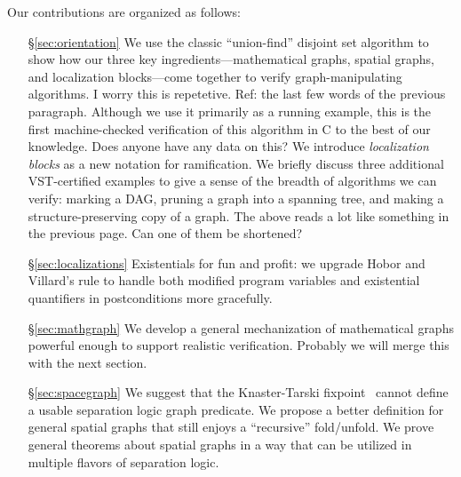 Our contributions are organized as follows:
\begin{itemize}
\item[\S\ref{sec:orientation}] We use the classic ``union-find'' disjoint set algorithm to show {\color{magenta}how our three key ingredients---mathematical graphs, spatial graphs, and localization blocks---come together to verify 
graph-manipulating algorithms.} 
{\color{blue}I worry this is repetetive. Ref: the last few words of the previous paragraph.}
Although we use it primarily as a running example, this is the first machine-checked verification of this algorithm in C to the best of our knowledge. {\color{blue} Does anyone have any data on this?}  {\color{magenta} We introduce \emph{localization blocks} as a new notation for ramification. We briefly discuss three additional VST-certified examples to give a sense of the breadth of algorithms we can verify: marking a DAG, pruning a graph into a spanning tree, and making a structure-preserving copy of a 
graph.}
{\color{blue}The above reads a lot like something in the previous page. Can one 
of them be shortened?}
\item[\S\ref{sec:localizations}] {\color{magenta} Existentials for fun and profit: we upgrade Hobor and Villard's  rule to handle both modified program variables and existential quantifiers in postconditions more gracefully.}
\item[\S\ref{sec:mathgraph}] We develop a general mechanization of mathematical graphs powerful enough to support realistic verification. {\color{magenta}Probably we will merge this with the next section.} %
\item[\S\ref{sec:spacegraph}] We suggest that the Knaster-Tarski fixpoint~\cite{tarski:fixpoint} cannot define a usable separation logic graph predicate.  We propose a better definition for general spatial graphs that still enjoys a ``recursive'' fold/unfold.  We prove general theorems about spatial graphs in a way that can be utilized in multiple flavors of separation logic. %

\end{itemize}
